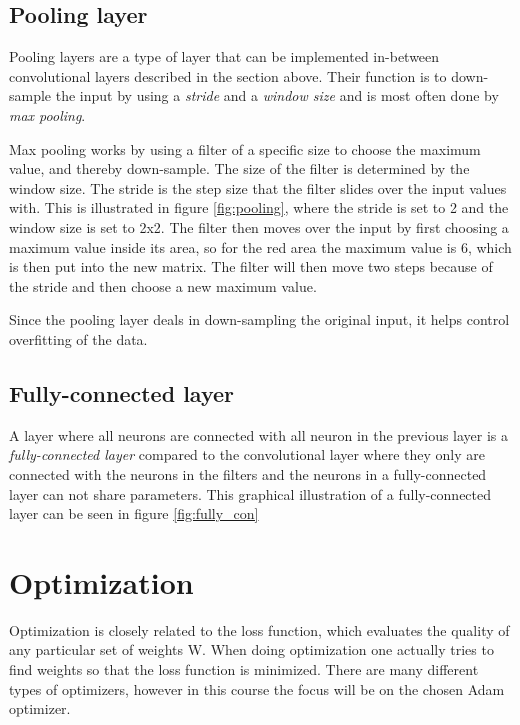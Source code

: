 \subsection{Pooling layer}
Pooling layers are a type of layer that can be implemented in-between convolutional layers described in the section above. Their function is to down-sample the input by using a \emph{stride} and a \emph{window size} and is most often done by \emph{max pooling}. 

Max pooling works by using a filter of a specific size to choose the maximum value, and thereby down-sample. The size of the filter is determined by the window size. The stride is the step size that the filter slides over the input values with. This is illustrated in figure \ref{fig:pooling}, where the stride is set to 2 and the window size is set to 2x2. The filter then moves over the input by first choosing a maximum value inside its area, so for the red area the maximum value is 6, which is then put into the new matrix. The filter will then move two steps because of the stride and then choose a new maximum value. 


Since the pooling layer deals in down-sampling the original input, it helps control overfitting of the data. 

\subsection{Fully-connected layer}
A layer where all neurons are connected with all neuron in the previous layer is a \emph{fully-connected layer} compared to the convolutional layer  where they only are connected with the neurons in the filters and the neurons in a fully-connected layer can not share parameters.
This graphical illustration of a fully-connected layer can be seen in figure \ref{fig:fully_con}



\section{Optimization}
Optimization is closely related to the loss function, which evaluates the quality of any particular set of weights W. When doing optimization one actually tries to find weights so that the loss function is minimized. There are many different types of optimizers, however in this course the focus will be on the chosen Adam optimizer. 

